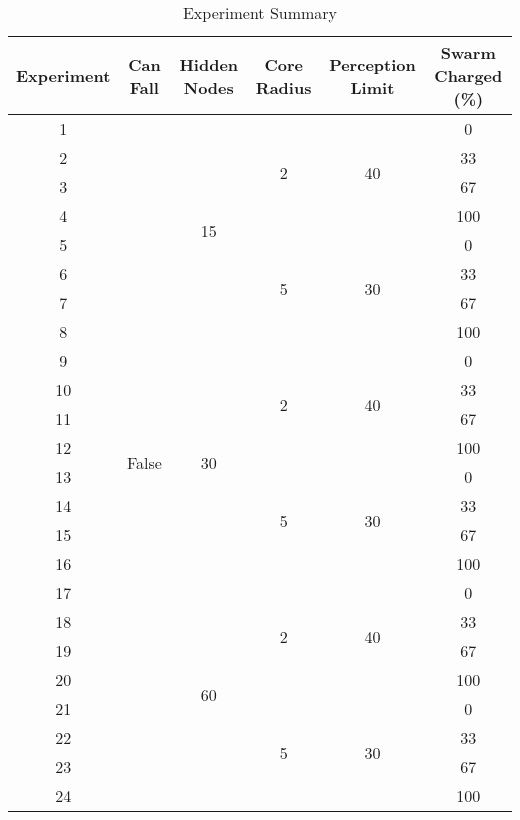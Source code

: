 \begin{table}
  \centering
  \begin{tabular}{|c|c|c|c|c|c|}
    \hline
    Experiment & Can Fall & Hidden Nodes & Core Radius & Perception Limit & Swarm Charged (\%) \\
    \hline
    1 & \multirow{ 24}{*}{False} & \multirow{ 8}{*}{15}  & \multirow{ 4}{*}{2} & \multirow{ 4}{*}{40} & 0 \\
    2 & & & & & 33\\
    3 & & & & & 67\\
    4 & & & & & 100\\ \cline{4-6}
    5 &  &   & \multirow{ 4}{*}{5} & \multirow{ 4}{*}{30} & 0 \\
    6 & & & & & 33\\
    7 & & & & & 67\\
    8 & & & & & 100\\ \cline{3-6}
    9 &  & \multirow{ 8}{*}{30}  & \multirow{ 4}{*}{2} & \multirow{ 4}{*}{40} & 0 \\
    10 & & & & & 33\\
    11 & & & & & 67\\
    12 & & & & & 100\\ \cline{4-6}
    13 &  &   & \multirow{ 4}{*}{5} & \multirow{ 4}{*}{30} & 0 \\
    14 & & & & & 33\\
    15 & & & & & 67\\
    16 & & & & & 100\\ \cline{3-6}
    17 &  & \multirow{ 8}{*}{60}  & \multirow{ 4}{*}{2} & \multirow{ 4}{*}{40} & 0 \\
    18 & & & & & 33\\
    19 & & & & & 67\\
    20 & & & & & 100\\ \cline{4-6}
    21 &  &   & \multirow{ 4}{*}{5} & \multirow{ 4}{*}{30} & 0 \\
    22 & & & & & 33\\
    23 & & & & & 67\\
    24 & & & & & 100\\
    \hline
  \end{tabular}
  \caption{Experiment Summary}
  \label{tab:experiment-labels-1}
\end{table}

